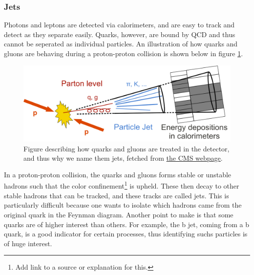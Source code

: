 \subsubsection*{Jets}
Photons and leptons are detected via calorimeters, and are easy to track and detect as they separate easily. Quarks, however, are bound by QCD and thus cannot be seperated as individual particles. 
An illustration of how quarks and gluons are behaving during a proton-proton collision is shown below in figure \ref{fig:cms_jets}.

\begin{figure}[h!]
    \includegraphics[width=\linewidth]{Figures/atlas/cms_Sketch_PartonParticleCaloJet.png}
    \caption{Figure describing how quarks and gluons are treated in the detector, and thus why we name them jets, fetched from \href{https://cms.cern/sites/default/files/field/image/Sketch_PartonParticleCaloJet.png}{the CMS webpage}. }
    \label{fig:cms_jets}
\end{figure}

In a proton-proton collision, the quarks and gluons forms stable or unstable hadrons such that the color confinement\footnote{Add link to a source or explanation for this.} is upheld. These then 
decay to other stable hadrons that can be tracked, and these tracks are called jets. This is particularly difficult because one wants to isolate which hadrons came from  the original quark in the 
Feynman diagram. Another point to make is that some quarks are of higher interest than others. For example, the b jet, coming from a b quark, is a good indicator for certain processes, 
thus identifying suchs particles is of huge interest. 